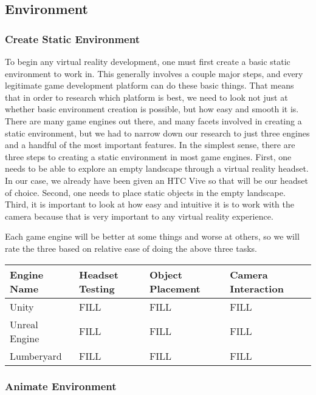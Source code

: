 \documentclass[10pt,journal,compsoc,onecolumn, draftclsnofoot]{IEEEtran}
\begin{document}
\subsection{Environment}
\subsubsection{Create Static Environment}

To begin any virtual reality development, one must first create a basic static environment to work in. This generally involves a couple major steps, and every legitimate game development platform can do these basic things.
That means that in order to research which platform is best, we need to look not just at whether basic environment creation is possible, but how easy and smooth it is.
There are many game engines out there, and many facets involved in creating a static environment, but we had to narrow down our research to just three engines and a handful of the most important features.
In the simplest sense, there are three steps to creating a static environment in most game engines.
First, one needs to be able to explore an empty landscape through a virtual reality headset.
In our case, we already have been given an HTC Vive so that will be our headset of choice.
Second, one needs to place static objects in the empty landscape.
Third, it is important to look at how easy and intuitive it is to work with the camera because that is very important to any virtual reality experience.

Each game engine will be better at some things and worse at others, so we will rate the three based on relative ease of doing the above three tasks.

\vspace{2mm}
\begin{table}[h!]
\centering
  \begin{tabu} to 1.0\textwidth { | X[l] || X[c] | X[c] | X[c] |  }
  \hline
  Engine Name & Headset Testing & Object Placement & Camera Interaction\\
  \hline
  Unity & FILL & FILL & FILL\\
  Unreal Engine & FILL & FILL & FILL\\
  Lumberyard & FILL & FILL & FILL\\
  \hline
  \end{tabu}
\end{table}
\vspace{2mm}

\subsubsection{Animate Environment}
\end{document}
